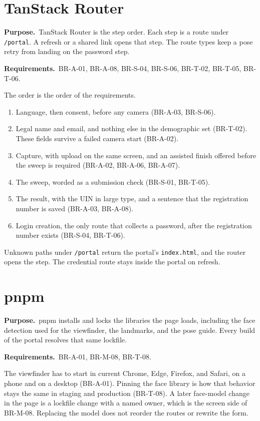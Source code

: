 \documentclass[11pt]{article}
\newcommand{\why}[1]{\textbf{Purpose.}\ #1\par}
\newcommand{\serves}[1]{\textbf{Requirements.}\ #1\par}
\begin{document}
\section{TanStack Router}

\why{TanStack Router is the step order. Each step is a route under \texttt{/portal}. A refresh or a shared link opens that step. The route types keep a pose retry from landing on the password step.}
\serves{BR-A-01, BR-A-08, BR-S-04, BR-S-06, BR-T-02, BR-T-05, BR-T-06.}

The order is the order of the requirements.

\begin{enumerate}[leftmargin=1.4em,itemsep=0.35em]
  \item Language, then consent, before any camera (BR-A-03, BR-S-06).
  \item Legal name and email, and nothing else in the demographic set (BR-T-02). These fields survive a failed camera start (BR-A-02).
  \item Capture, with upload on the same screen, and an assisted finish offered before the sweep is required (BR-A-02, BR-A-06, BR-A-07).
  \item The sweep, worded as a submission check (BR-S-01, BR-T-05).
  \item The result, with the UIN in large type, and a sentence that the registration number is saved (BR-A-03, BR-A-08).
  \item Login creation, the only route that collects a password, after the registration number exists (BR-S-04, BR-T-06).
\end{enumerate}

Unknown paths under \texttt{/portal} return the portal's \texttt{index.html}, and the router opens the step. The credential route stays inside the portal on refresh.

\section{pnpm}

\why{pnpm installs and locks the libraries the page loads, including the face detection used for the viewfinder, the landmarks, and the pose guide. Every build of the portal resolves that same lockfile.}
\serves{BR-A-01, BR-M-08, BR-T-08.}

The viewfinder has to start in current Chrome, Edge, Firefox, and Safari, on a phone and on a desktop (BR-A-01). Pinning the face library is how that behavior stays the same in staging and production (BR-T-08). A later face-model change in the page is a lockfile change with a named owner, which is the screen side of BR-M-08. Replacing the model does not reorder the routes or rewrite the form.
\end{document}
